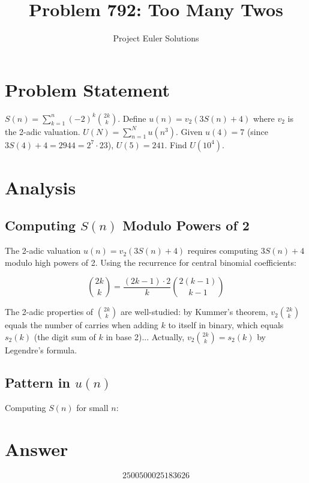 \documentclass[11pt]{article}
\title{Problem 792: Too Many Twos}
\author{Project Euler Solutions}
\date{}
\begin{document}
\maketitle
\section{Problem Statement}
$S(n) = \sum_{k=1}^{n} (-2)^k \binom{2k}{k}$. Define $u(n) = v_2(3S(n)+4)$ where $v_2$ is the 2-adic valuation. $U(N) = \sum_{n=1}^{N} u(n^3)$. Given $u(4)=7$ (since $3S(4)+4=2944=2^7 \cdot 23$), $U(5)=241$. Find $U(10^4)$.
\section{Analysis}
\subsection*{Computing $S(n)$ Modulo Powers of 2}

The 2-adic valuation $u(n) = v_2(3S(n)+4)$ requires computing $3S(n)+4$ modulo high powers of 2. Using the recurrence for central binomial coefficients:

$$\binom{2k}{k} = \frac{(2k-1) \cdot 2}{k} \binom{2(k-1)}{k-1}$$

The 2-adic properties of $\binom{2k}{k}$ are well-studied: by Kummer's theorem, $v_2\binom{2k}{k}$ equals the number of carries when adding $k$ to itself in binary, which equals $s_2(k)$ (the digit sum of $k$ in base 2)... Actually, $v_2\binom{2k}{k} = s_2(k)$ by Legendre's formula.

\subsection*{Pattern in $u(n)$}

Computing $S(n)$ for small $n$:
\section{Answer}

\[
\boxed{2500500025183626}
\]
\end{document}
